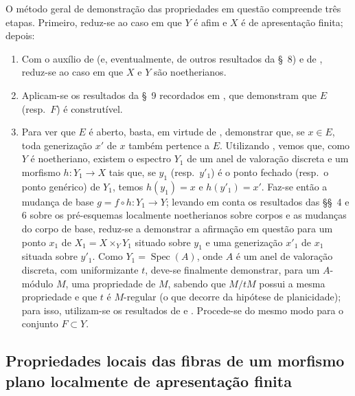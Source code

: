 \begin{env}[12.0.2]
\label{IV.12.0.2}
O método geral de demonstração das propriedades em questão compreende
três etapas. Primeiro, reduz-se ao caso em que $Y$ é afim e $X$ é de
apresentação finita; depois:
\begin{enumerate}[label=\emph{\Alph*)}]
\item Com o auxílio de  (e, eventualmente, de outros
resultados da \S~8) e de , reduz-se ao caso em que
$X$ e $Y$ são noetherianos.
\item Aplicam-se os resultados da \S~9 recordados em
, que demonstram que $E$ (resp.\ $F$) é construtível.
\item Para ver que $E$ é aberto, basta, em virtude de
, demonstrar que, se $x\in E$, toda generização
$x'$ de $x$ também pertence a $E$. Utilizando
, vemos que, como $Y$ é noetheriano, existem o
espectro $Y_1$ de um anel de valoração discreta e um morfismo
$h:Y_1\to X$ tais que, se $y_1$ (resp.\ $y'_1$) é o ponto fechado
(resp.\ o ponto genérico) de $Y_1$, temos $h(y_1)=x$ e
$h(y'_1)=x'$. Faz-se então a mudança de base
$g=f\circ h:Y_1\to Y$; levando em conta os resultados das
\S\S~4 e 6 sobre os pré-esquemas localmente noetherianos sobre
corpos e as mudanças do corpo de base, reduz-se a demonstrar a
afirmação em questão para um ponto $x_1$ de
$X_1=X\times_Y Y_1$ situado sobre $y_1$ e uma generização
$x'_1$ de $x_1$ situada sobre $y'_1$. Como
$Y_1=\operatorname{Spec}(A)$, onde $A$ é um anel de valoração
discreta, com uniformizante $t$, deve-se finalmente demonstrar,
para um $A$-módulo $M$, uma propriedade de $M$, sabendo que
$M/tM$ possui a mesma propriedade e que $t$ é $M$-regular
(o que decorre da hipótese de planicidade); para isso,
utilizam-se os resultados de  e
. Procede-se do mesmo modo para o conjunto
$F\subset Y$.
\end{enumerate}
\end{env}


\subsection{Propriedades locais das fibras de um morfismo plano localmente de apresentação finita}
\label{subsection:IV.12.1}

